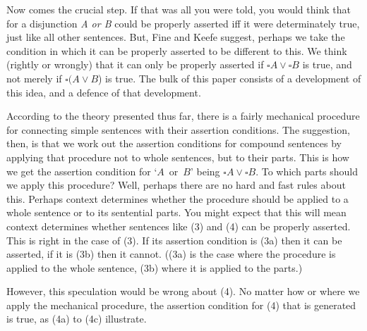 Now comes the crucial step. If that was all you were told, you would think that for a disjunction \textit{A or B} could be properly asserted iff it were determinately true, just like all other sentences. But, Fine and Keefe suggest, perhaps we take the condition in which it can be properly asserted to be different to this. We think (rightly or wrongly) that it can only be properly asserted if \(\square A \vee \square B\) is true, and not merely if \(\square (A \vee B\)) is true. The bulk of this paper consists of a development of this idea, and a defence of that development.

According to the theory presented thus far, there is a fairly mechanical procedure for connecting simple sentences with their assertion conditions. The suggestion, then, is that we work out the assertion conditions for compound sentences by applying that procedure not to whole sentences, but to their parts. This is how we get the assertion condition for `\(A\)~or~\(B\)' being \(\square A \vee \square B\). To which parts should we apply this procedure? Well, perhaps there are no hard and fast rules about this. Perhaps context determines whether the procedure should be applied to a whole sentence or to its sentential parts. You might expect that this will mean context determines whether sentences like (3) and (4) can be properly asserted. This is right in the case of (3). If its assertion condition is (3a) then it can be asserted, if it is (3b) then it cannot. ((3a) is the case where the procedure is applied to the whole sentence, (3b) where it is applied to the parts.)


\noindent However, this speculation would be wrong about (4). No matter how or where we apply the mechanical procedure, the assertion condition for (4) that is generated is true, as (4a) to (4c) illustrate.


